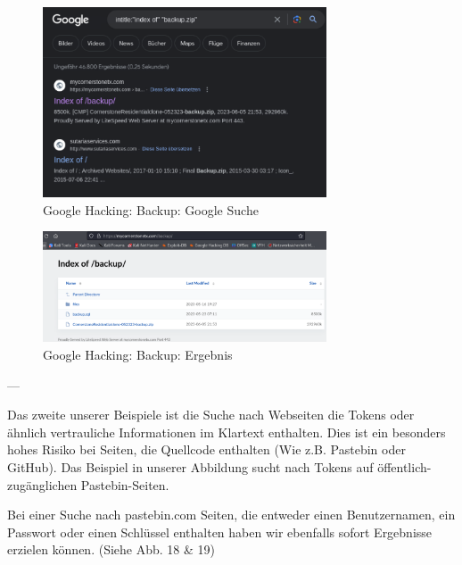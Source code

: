 \documentclass{article}
\begin{document}
\begin{figure}[H]
	\includegraphics[width=0.75\textwidth]{images/16}
	\centering
	\caption{Google Hacking: Backup: Google Suche}
\end{figure}

\begin{figure}[H]
	\includegraphics[width=0.75\textwidth]{images/17}
	\centering
	\caption{Google Hacking: Backup: Ergebnis}
\end{figure}

---

Das zweite unserer Beispiele ist die Suche nach Webseiten die Tokens oder ähnlich vertrauliche 
Informationen im Klartext enthalten. Dies ist ein besonders hohes Risiko bei Seiten, die 
Quellcode enthalten (Wie z.B. Pastebin oder GitHub). Das Beispiel in unserer Abbildung 
sucht nach Tokens auf öffentlich-zugänglichen Pastebin-Seiten.

Bei einer Suche nach pastebin.com Seiten, die entweder einen Benutzernamen, ein Passwort oder
einen Schlüssel enthalten haben wir ebenfalls sofort Ergebnisse erzielen können.
(Siehe Abb. 18 \& 19)
\end{document}
